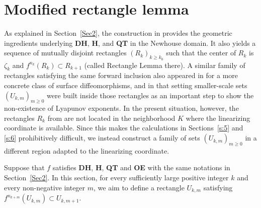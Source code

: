 \documentclass{amsart}
\theoremstyle{plain}
\theoremstyle{definition}
\theoremstyle{remark}
\numberwithin{equation}{section}
\begin{document}
\section{Modified rectangle lemma}\label{Sec3}
As explained in Section~\ref{Sec2}, the construction in \cite{KS2017} provides the geometric ingredients underlying {\bf DH}, {\bf H}, and {\bf QT} in the Newhouse domain. It also yields a sequence of mutually disjoint rectangles $(R_k)_{k\ge k_0}$ such that the center of $R_k$ is $\zeta_k$ and $f^{n_k}(R_k) \subset R_{k+1}$ (called Rectangle Lemma there).
A similar family of rectangles satisfying the same forward inclusion also appeared in \cite{KLNS2022} for a more concrete class of surface diffeomorphisms, and in that setting smaller-scale sets $(U_{k,m})_{m\ge0}$ were built inside those rectangles as an important step to show the non-existence of Lyapunov exponents.
In the present situation, however, the rectangles $R_k$ from \cite{KS2017} are not located in the neighborhood $K$ where the linearizing coordinate is available. Since this makes the calculations in Sections~\ref{s:5} and \ref{s:6} prohibitively difficult, we instead construct a family of sets $(U_{k,m})_{m\ge0}$ in a different region adapted to the linearizing coordinate.


Suppose that $f$ satisfies {\bf DH}, {\bf H}, {\bf QT} and {\bf OE} with the same notations in Section~\ref{Sec2}.
In this section, for every sufficiently large positive integer $k$ and every non-negative integer $m$, we aim to define a rectangle $U_{k,m}$ satisfying $f^{n_{k+m}}(U_{k,m})\subset U_{k,m+1}$. 
\end{document}

